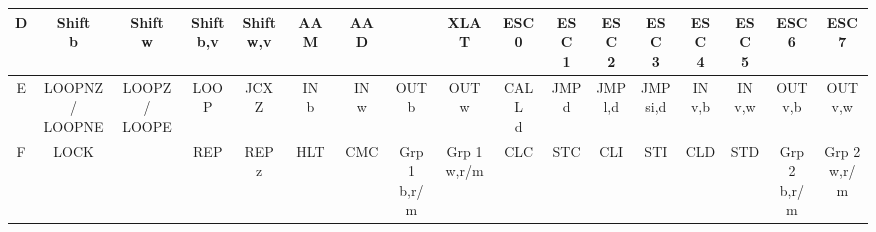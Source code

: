 {\begin{longtable}{|c|c|c|c|c|c|c|c|c|c|c|c|c|c|c|c|c|}
\hline
D & \makecell{Shift\\b} & \makecell{Shift\\w} & \makecell{Shift\\b,v} & \makecell{Shift\\w,v} & AAM & AAD &  & XLAT & \makecell{ESC\\0} & \makecell{ESC\\1} & \makecell{ESC\\2} & \makecell{ESC\\3} & \makecell{ESC\\4} & \makecell{ESC\\5} & \makecell{ESC\\6} & \makecell{ESC\\7} \\
\hline
E & \makecell{LOOPNZ/\\LOOPNE} & \makecell{LOOPZ/\\LOOPE} & LOOP & JCXZ & \makecell{IN\\b} & \makecell{IN\\w} & \makecell{OUT\\b} & \makecell{OUT\\w} & \makecell{CALL\\d} & \makecell{JMP\\d} & \makecell{JMP\\l,d} & \makecell{JMP\\si,d} & \makecell{IN\\v,b} & \makecell{IN\\v,w} & \makecell{OUT\\v,b} & \makecell{OUT\\v,w} \\
\hline
F & LOCK &  & REP & \makecell{REP\\z} & HLT & CMC & \makecell{Grp 1\\b,r/m} & \makecell{Grp 1\\w,r/m} & CLC & STC & CLI & STI & CLD & STD & \makecell{Grp 2\\b,r/m} & \makecell{Grp 2\\w,r/m} \\
\hline

\end{longtable}

}

